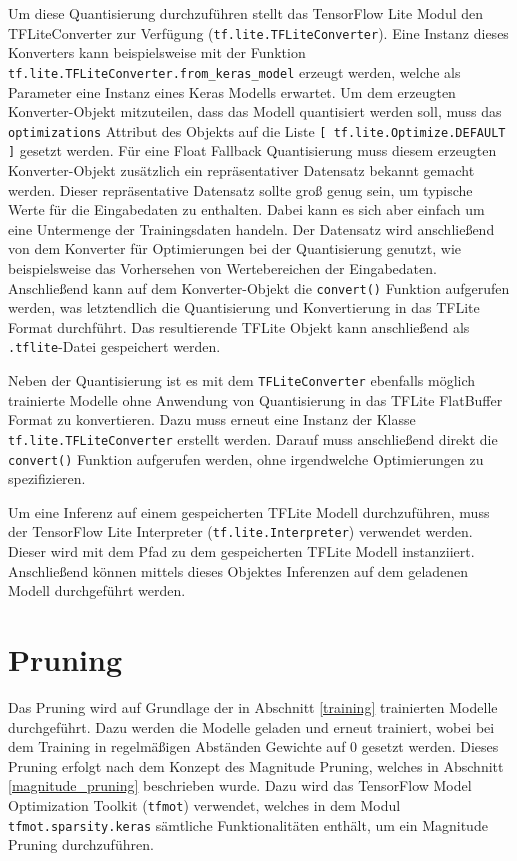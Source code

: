 Um diese Quantisierung durchzuführen stellt das TensorFlow Lite Modul den TFLiteConverter zur Verfügung (\lstinline{tf.lite.TFLiteConverter}). Eine Instanz dieses Konverters kann beispielsweise mit der Funktion \lstinline{tf.lite.TFLiteConverter.from_keras_model} erzeugt werden, welche als Parameter eine Instanz eines Keras Modells erwartet. Um dem erzeugten Konverter-Objekt mitzuteilen, dass das Modell quantisiert werden soll, muss das \lstinline{optimizations} Attribut des Objekts auf die Liste \lstinline{[ tf.lite.Optimize.DEFAULT ]} gesetzt werden. Für eine Float Fallback Quantisierung muss diesem erzeugten Konverter-Objekt zusätzlich ein repräsentativer Datensatz bekannt gemacht werden. Dieser repräsentative Datensatz sollte groß genug sein, um typische Werte für die Eingabedaten zu enthalten. Dabei kann es sich aber einfach um eine Untermenge der Trainingsdaten handeln. Der Datensatz wird anschließend von dem Konverter für Optimierungen bei der Quantisierung genutzt, wie beispielsweise das Vorhersehen von Wertebereichen der Eingabedaten. Anschließend kann auf dem Konverter-Objekt die \lstinline{convert()} Funktion aufgerufen werden, was letztendlich die Quantisierung und Konvertierung in das TFLite Format durchführt. Das resultierende TFLite Objekt kann anschließend als \lstinline{.tflite}-Datei gespeichert werden.

Neben der Quantisierung ist es mit dem \lstinline{TFLiteConverter} ebenfalls möglich trainierte Modelle ohne Anwendung von Quantisierung in das TFLite FlatBuffer Format zu konvertieren. Dazu muss erneut eine Instanz der Klasse \lstinline{tf.lite.TFLiteConverter} erstellt werden. Darauf muss anschließend direkt die \lstinline{convert()} Funktion aufgerufen werden, ohne irgendwelche Optimierungen zu spezifizieren.

Um eine Inferenz auf einem gespeicherten TFLite Modell durchzuführen, muss der TensorFlow Lite Interpreter (\lstinline{tf.lite.Interpreter}) verwendet werden. Dieser wird mit dem Pfad zu dem gespeicherten TFLite Modell instanziiert. Anschließend können mittels dieses Objektes Inferenzen auf dem geladenen Modell durchgeführt werden.



\section{Pruning}
\label{impl_pruning}
Das Pruning wird auf Grundlage der in Abschnitt \ref{training} trainierten Modelle durchgeführt. Dazu werden die Modelle geladen und erneut trainiert, wobei bei dem Training in regelmäßigen Abständen Gewichte auf 0 gesetzt werden. Dieses Pruning erfolgt nach dem Konzept des Magnitude Pruning, welches in Abschnitt \ref{magnitude_pruning} beschrieben wurde. Dazu wird das TensorFlow Model Optimization Toolkit (\lstinline{tfmot}) verwendet, welches in dem Modul \lstinline{tfmot.sparsity.keras} sämtliche Funktionalitäten enthält, um ein Magnitude Pruning durchzuführen.


